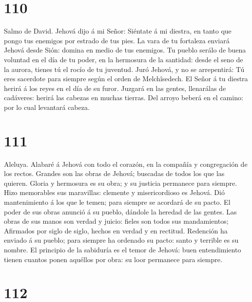 \hypertarget{section-109}{%
\section{110}\label{section-109}}

 Salmo de David. Jehová dijo á mi Señor: Siéntate á mi
diestra, en tanto que pongo tus enemigos por estrado de tus pies.
 La vara de tu fortaleza enviará Jehová desde Sión: domina
en medio de tus enemigos.  Tu pueblo serálo de buena
voluntad en el día de tu poder, en la hermosura de la santidad: desde el
seno de la aurora, tienes tú el rocío de tu juventud. 
Juró Jehová, y no se arrepentirá: Tú eres sacerdote para siempre según
el orden de Melchîsedech.  El Señor á tu diestra herirá á
los reyes en el día de su furor.  Juzgará en las gentes,
llenarálas de cadáveres: herirá las cabezas en muchas tierras.
 Del arroyo beberá en el camino: por lo cual levantará
cabeza.

\hypertarget{section-110}{%
\section{111}\label{section-110}}

 Aleluya. Alabaré á Jehová con todo el corazón, en la
compañía y congregación de los rectos.  Grandes son las
obras de Jehová; buscadas de todos los que las quieren. 
Gloria y hermosura es su obra; y su justicia permanece para siempre.
 Hizo memorables sus maravillas: clemente y misericordioso
es Jehová.  Dió mantenimiento á los que le temen; para
siempre se acordará de su pacto.  El poder de sus obras
anunció á su pueblo, dándole la heredad de las gentes. 
Las obras de sus manos son verdad y juicio: fieles son todos sus
mandamientos;  Afirmados por siglo de siglo, hechos en
verdad y en rectitud.  Redención ha enviado á su pueblo;
para siempre ha ordenado su pacto: santo y terrible es su nombre.
 El principio de la sabiduría es el temor de Jehová: buen
entendimiento tienen cuantos ponen aquéllos por obra: su loor permanece
para siempre.

\hypertarget{section-111}{%
\section{112}\label{section-111}}

